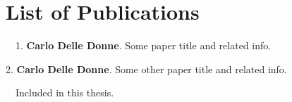 \chapter*{List of Publications}
\label{publications}

\begin{etaremune}
    \item[\faFileTextO~~1.] \textbf{Carlo Delle Donne}. Some paper title and related info.
    \item[2.] \textbf{Carlo Delle Donne}. Some other paper title and related info.
\end{etaremune}

\vspace{0.5cm}
\noindent
\faFileTextO~~Included in this thesis.
